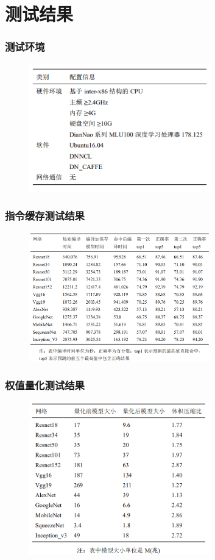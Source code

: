 \documentclass[12pt]{ctexbeamer}
\begin{document}
\section{测试结果}

\begin{frame}
  \frametitle{测试环境}
    \begin{figure}
	 \includegraphics[width=0.7\textwidth]{figures/test_env.png}
    \end{figure}
\end{frame}

\begin{frame}
  \frametitle{指令缓存测试结果}
    \begin{figure}
	 \includegraphics[width=0.7\textwidth]{figures/inst_cache.png}
    \end{figure}
\end{frame}


\begin{frame}
  \frametitle{权值量化测试结果}
    \begin{figure}
	 \includegraphics[width=0.7\textwidth]{figures/quant_bulk.png}
    \end{figure}
\end{frame}
\end{document}
